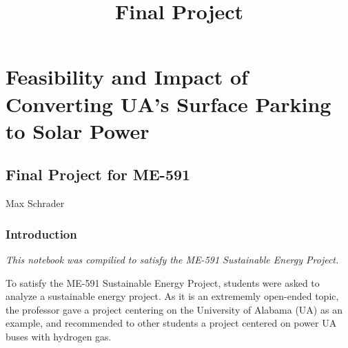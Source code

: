 \documentclass[11pt]{article}
\title{Final Project}
\begin{document}
    
    \maketitle
    
    

    
    \hypertarget{feasibility-and-impact-of-converting-uas-surface-parking-to-solar-power}{%
\section{Feasibility and Impact of Converting UA's Surface Parking to
Solar
Power}\label{feasibility-and-impact-of-converting-uas-surface-parking-to-solar-power}}

\hypertarget{final-project-for-me-591}{%
\subsection{Final Project for ME-591}\label{final-project-for-me-591}}

Max Schrader

    \hypertarget{introduction}{%
\subsubsection{Introduction}\label{introduction}}

    \emph{This notebook was compilied to satisfy the ME-591 Sustainable
Energy Project.}

To satisfy the ME-591 Sustainable Energy Project, students were asked to
analyze a sustainable energy project. As it is an extrememly open-ended
topic, the professor gave a project centering on the University of
Alabama (UA) as an example, and recommended to other students a project
centered on power UA buses with hydrogen gas.
\end{document}
